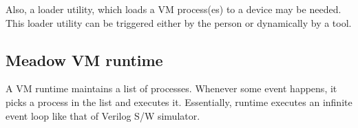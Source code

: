 \documentclass{note}
\begin{document}
Also, a loader utility, which loads a VM process(es) to a device may be
needed. This loader utility can be triggered either by the person or
dynamically by a tool. 

\subsection{Meadow VM runtime}
A VM runtime maintains a list of processes. Whenever some event happens, 
it picks a process in the list and executes it.
Essentially, runtime executes an infinite event loop like that of Verilog S/W
simulator. 







\end{document}

